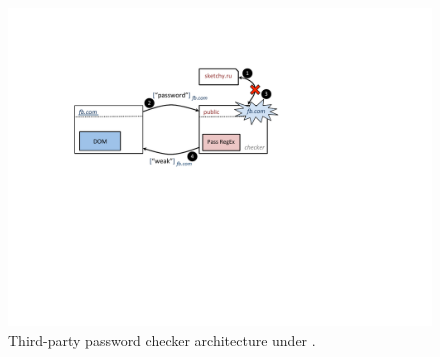\begin{figure}
\centerline{\includegraphics[width=\columnwidth]{checker}}
\caption{\label{fig:checker} Third-party password checker architecture
under \sys{}.}
\end{figure}


